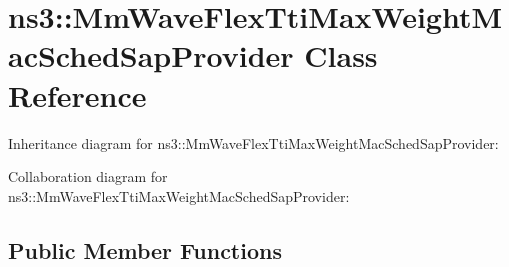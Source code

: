 \hypertarget{classns3_1_1MmWaveFlexTtiMaxWeightMacSchedSapProvider}{}\section{ns3\+:\+:Mm\+Wave\+Flex\+Tti\+Max\+Weight\+Mac\+Sched\+Sap\+Provider Class Reference}
\label{classns3_1_1MmWaveFlexTtiMaxWeightMacSchedSapProvider}


Inheritance diagram for ns3\+:\+:Mm\+Wave\+Flex\+Tti\+Max\+Weight\+Mac\+Sched\+Sap\+Provider\+:


Collaboration diagram for ns3\+:\+:Mm\+Wave\+Flex\+Tti\+Max\+Weight\+Mac\+Sched\+Sap\+Provider\+:
\subsection*{Public Member Functions}
